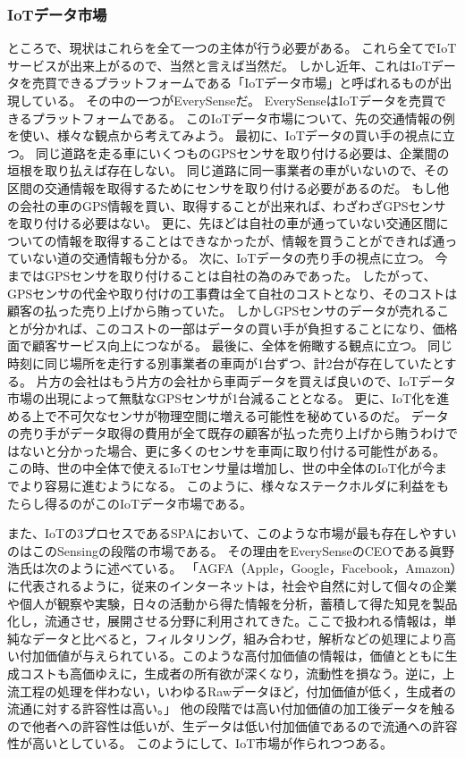 \subsubsection{IoTデータ市場}
ところで、現状はこれらを全て一つの主体が行う必要がある。
これら全てでIoTサービスが出来上がるので、当然と言えば当然だ。
しかし近年、これはIoTデータを売買できるプラットフォームである「IoTデータ市場」と呼ばれるものが出現している。
その中の一つがEverySense\cite{everysense}だ。
EverySenseはIoTデータを売買できるプラットフォームである。
このIoTデータ市場について、先の交通情報の例を使い、様々な観点から考えてみよう。
最初に、IoTデータの買い手の視点に立つ。
同じ道路を走る車にいくつものGPSセンサを取り付ける必要は、企業間の垣根を取り払えば存在しない。
同じ道路に同一事業者の車がいないので、その区間の交通情報を取得するためにセンサを取り付ける必要があるのだ。
もし他の会社の車のGPS情報を買い、取得することが出来れば、わざわざGPSセンサを取り付ける必要はない。
更に、先ほどは自社の車が通っていない交通区間についての情報を取得することはできなかったが、情報を買うことができれば通っていない道の交通情報も分かる。
次に、IoTデータの売り手の視点に立つ。
今まではGPSセンサを取り付けることは自社の為のみであった。
したがって、GPSセンサの代金や取り付けの工事費は全て自社のコストとなり、そのコストは顧客の払った売り上げから賄っていた。
しかしGPSセンサのデータが売れることが分かれば、このコストの一部はデータの買い手が負担することになり、価格面で顧客サービス向上につながる。
最後に、全体を俯瞰する観点に立つ。
同じ時刻に同じ場所を走行する別事業者の車両が1台ずつ、計2台が存在していたとする。
片方の会社はもう片方の会社から車両データを買えば良いので、IoTデータ市場の出現によって無駄なGPSセンサが1台減ることとなる。
更に、IoT化を進める上で不可欠なセンサが物理空間に増える可能性を秘めているのだ。
データの売り手がデータ取得の費用が全て既存の顧客が払った売り上げから賄うわけではないと分かった場合、更に多くのセンサを車両に取り付ける可能性がある。
この時、世の中全体で使えるIoTセンサ量は増加し、世の中全体のIoT化が今までより容易に進むようになる。
このように、様々なステークホルダに利益をもたらし得るのがこのIoTデータ市場である。

また、IoTの3プロセスであるSPAにおいて、このような市場が最も存在しやすいのはこのSensingの段階の市場である。
その理由をEverySenseのCEOである眞野浩氏は次のように述べている。\cite{everysense_ceo}
「AGFA（Apple，Google，Facebook，Amazon）に代表されるように，従来のインターネットは，社会や自然に対して個々の企業や個人が観察や実験，日々の活動から得た情報を分析，蓄積して得た知見を製品化し，流通させ，展開させる分野に利用されてきた。ここで扱われる情報は，単純なデータと比べると，フィルタリング，組み合わせ，解析などの処理により高い付加価値が与えられている。このような高付加価値の情報は，価値とともに生成コストも高価ゆえに，生成者の所有欲が深くなり，流動性を損なう。逆に，上流工程の処理を伴わない，いわゆるRawデータほど，付加価値が低く，生成者の流通に対する許容性は高い。」
他の段階では高い付加価値の加工後データを触るので他者への許容性は低いが、生データは低い付加価値であるので流通への許容性が高いとしている。
このようにして、IoT市場が作られつつある。

